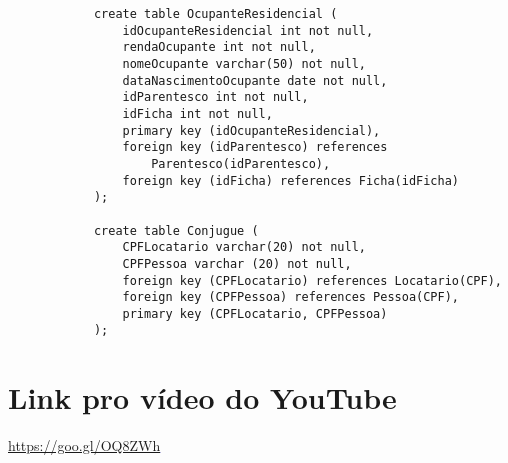 \documentclass{article}
\begin{document}
\begin{lstlisting}
            create table OcupanteResidencial (
            	idOcupanteResidencial int not null,
            	rendaOcupante int not null,
            	nomeOcupante varchar(50) not null,
            	dataNascimentoOcupante date not null,
            	idParentesco int not null,
            	idFicha int not null,
            	primary key (idOcupanteResidencial),
            	foreign key (idParentesco) references 
            	    Parentesco(idParentesco),
            	foreign key (idFicha) references Ficha(idFicha)
            );
            
            create table Conjugue (
            	CPFLocatario varchar(20) not null,
            	CPFPessoa varchar (20) not null,
            	foreign key (CPFLocatario) references Locatario(CPF),
            	foreign key (CPFPessoa) references Pessoa(CPF),
            	primary key (CPFLocatario, CPFPessoa)
            );
        \end{lstlisting}
    
    \section{Link pro vídeo do YouTube}
        \textcolor{blue}{\underline{\url{https://goo.gl/OQ8ZWh}}}
    
\end{document}
